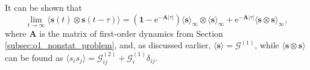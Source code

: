 \documentclass[a4paper, 11pt]{article}
\begin{document}
It can be shown that
\begin{equation}
  \lim_{t\to\infty}\langle\mathbf{ s }(t)\otimes\mathbf{ s }(t-\tau)\rangle = (\mathbf 1-\mathrm e^{-\mathbf A|\tau|})\langle\mathbf s \rangle_\infty\otimes\langle\mathbf s \rangle_\infty + \mathrm e^{-\mathbf A|\tau|}\langle\mathbf s \otimes\mathbf s \rangle_\infty,
\end{equation}
where $\mathbf A$ is the matrix of first-order dynamics from Section \ref{subsec:o1_nonstat_problem}, and, as discussed earlier, $\langle\mathbf s \rangle = \mathbf{\mathcal G}^{(1)}$, while $\langle\mathbf s \otimes\mathbf s \rangle$ can be found as $\langle s _i s _j\rangle = {\mathcal G}^{(2)}_{ij} + \mathcal G^{(1)}_i\delta_{ij}$.




\end{document}
